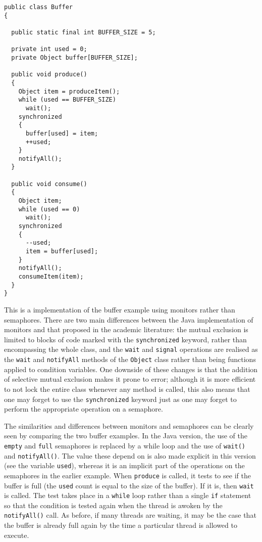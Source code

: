 \begin{verbatim}
public class Buffer
{

  public static final int BUFFER_SIZE = 5;

  private int used = 0;
  private Object buffer[BUFFER_SIZE];
  
  public void produce()
  {
    Object item = produceItem();
    while (used == BUFFER_SIZE)
      wait();
    synchronized
    {
      buffer[used] = item;
      ++used;
    }
    notifyAll();
  }

  public void consume()
  {
    Object item;
    while (used == 0)
      wait();
    synchronized
    {
      --used;
      item = buffer[used];
    }
    notifyAll();
    consumeItem(item);
  }
}
\end{verbatim}

This is a implementation of the buffer example using monitors rather
than semaphores.  There are two main differences between the Java
implementation of monitors and that proposed in the academic
literature: the mutual exclusion is limited to blocks of code marked
with the \texttt{synchronized} keyword, rather than encompassing the
whole class, and the \texttt{wait} and \texttt{signal} operations are
realised as the \texttt{wait} and \texttt{notifyAll} methods of the
\texttt{Object} class rather than being functions applied to condition
variables.  One downside of these changes is that the addition of
selective mutual exclusion makes it prone to error; although it is
more efficient to not lock the entire class whenever any method is
called, this also means that one may forget to use the
\texttt{synchronized} keyword just as one may forget to perform the
appropriate operation on a semaphore.

The similarities and differences between monitors and semaphores can
be clearly seen by comparing the two buffer examples.  In the Java
version, the use of the \texttt{empty} and \texttt{full} semaphores is
replaced by a while loop and the use of \texttt{wait()} and
\texttt{notifyAll()}.  The value these depend on is also made explicit
in this version (see the variable \texttt{used}), whereas it is an
implicit part of the operations on the semaphores in the earlier
example.  When \texttt{produce} is called, it tests to see if the
buffer is full (the \texttt{used} count is equal to the size of the
buffer).  If it is, then \texttt{wait} is called.  The test takes
place in a \texttt{while} loop rather than a single \texttt{if}
statement so that the condition is tested again when the thread is
awoken by the \texttt{notifyAll()} call.  As before, if many threads
are waiting, it may be the case that the buffer is already full again
by the time a particular thread is allowed to execute.

